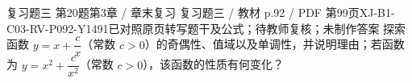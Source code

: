 \par\noindent\begin{minipage}{\linewidth}
\begin{bankitem}{复习题三 第20题}{第3章 / 章末复习 复习题三 / 教材 p.92 / PDF 第99页}{XJ-B1-C03-RV-P092-Y1491}{已对照原页转写题干及公式；待教师复核；未制作答案}
探索函数 $y=x+\dfrac cx$（常数 $c>0$）的奇偶性、值域以及单调性，并说明理由；若函数为 $y=x^2+\dfrac c{x^2}$（常数 $c>0$），该函数的性质有何变化？
\end{bankitem}
\end{minipage}\par\medskip
